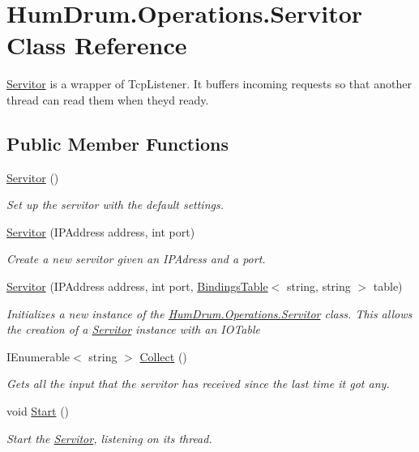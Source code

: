 \hypertarget{classHumDrum_1_1Operations_1_1Servitor}{}\section{Hum\+Drum.\+Operations.\+Servitor Class Reference}
\label{classHumDrum_1_1Operations_1_1Servitor}


\hyperlink{classHumDrum_1_1Operations_1_1Servitor}{Servitor} is a wrapper of Tcp\+Listener. It buffers incoming requests so that another thread can read them when they\textquotesingle{}d ready.  


\subsection*{Public Member Functions}
\begin{DoxyCompactItemize}
\item 
\hyperlink{classHumDrum_1_1Operations_1_1Servitor_a3da58c881e82de9be18014a186e115f5}{Servitor} ()
\begin{DoxyCompactList}\small\item\em Set up the servitor with the default settings. \end{DoxyCompactList}\item 
\hyperlink{classHumDrum_1_1Operations_1_1Servitor_ac77fd091ee638a61e42fa013c7a330ff}{Servitor} (I\+P\+Address address, int port)
\begin{DoxyCompactList}\small\item\em Create a new servitor given an I\+P\+Adress and a port. \end{DoxyCompactList}\item 
\hyperlink{classHumDrum_1_1Operations_1_1Servitor_aed529778829ebe0befe5da40f403470c}{Servitor} (I\+P\+Address address, int port, \hyperlink{classHumDrum_1_1Structures_1_1BindingsTable}{Bindings\+Table}$<$ string, string $>$ table)
\begin{DoxyCompactList}\small\item\em Initializes a new instance of the \hyperlink{classHumDrum_1_1Operations_1_1Servitor}{Hum\+Drum.\+Operations.\+Servitor} class. This allows the creation of a \hyperlink{classHumDrum_1_1Operations_1_1Servitor}{Servitor} instance with an I\+O\+Table \end{DoxyCompactList}\item 
I\+Enumerable$<$ string $>$ \hyperlink{classHumDrum_1_1Operations_1_1Servitor_af199facc3fcd3b231a75864e2c0c974b}{Collect} ()
\begin{DoxyCompactList}\small\item\em Gets all the input that the servitor has received since the last time it got any. \end{DoxyCompactList}\item 
void \hyperlink{classHumDrum_1_1Operations_1_1Servitor_a6b5653f2dc424b576a6cfdf9bfe3f021}{Start} ()
\begin{DoxyCompactList}\small\item\em Start the \hyperlink{classHumDrum_1_1Operations_1_1Servitor}{Servitor}, listening on its thread. \end{DoxyCompactList}\end{DoxyCompactItemize}
